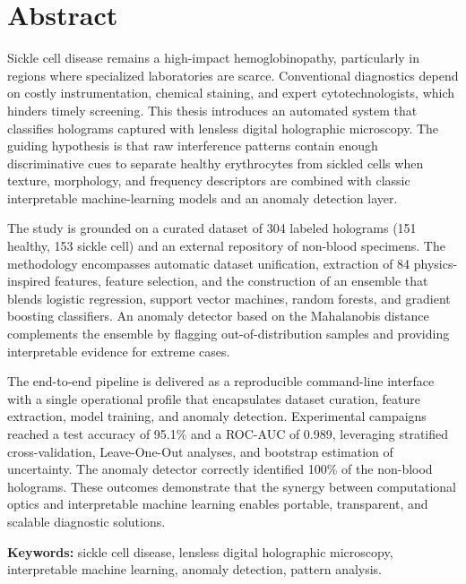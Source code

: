 \chapter*{Abstract}
Sickle cell disease remains a high-impact hemoglobinopathy, particularly in regions where specialized laboratories are scarce. Conventional diagnostics depend on costly instrumentation, chemical staining, and expert cytotechnologists, which hinders timely screening. This thesis introduces an automated system that classifies holograms captured with lensless digital holographic microscopy. The guiding hypothesis is that raw interference patterns contain enough discriminative cues to separate healthy erythrocytes from sickled cells when texture, morphology, and frequency descriptors are combined with classic interpretable machine-learning models and an anomaly detection layer.

The study is grounded on a curated dataset of 304 labeled holograms (151 healthy, 153 sickle cell) and an external repository of non-blood specimens. The methodology encompasses automatic dataset unification, extraction of 84 physics-inspired features, feature selection, and the construction of an ensemble that blends logistic regression, support vector machines, random forests, and gradient boosting classifiers. An anomaly detector based on the Mahalanobis distance complements the ensemble by flagging out-of-distribution samples and providing interpretable evidence for extreme cases.

The end-to-end pipeline is delivered as a reproducible command-line interface with a single operational profile that encapsulates dataset curation, feature extraction, model training, and anomaly detection. Experimental campaigns reached a test accuracy of 95.1\% and a ROC-AUC of 0.989, leveraging stratified cross-validation, Leave-One-Out analyses, and bootstrap estimation of uncertainty. The anomaly detector correctly identified 100\% of the non-blood holograms. These outcomes demonstrate that the synergy between computational optics and interpretable machine learning enables portable, transparent, and scalable diagnostic solutions.

\textbf{Keywords:} sickle cell disease, lensless digital holographic microscopy, interpretable machine learning, anomaly detection, pattern analysis.
